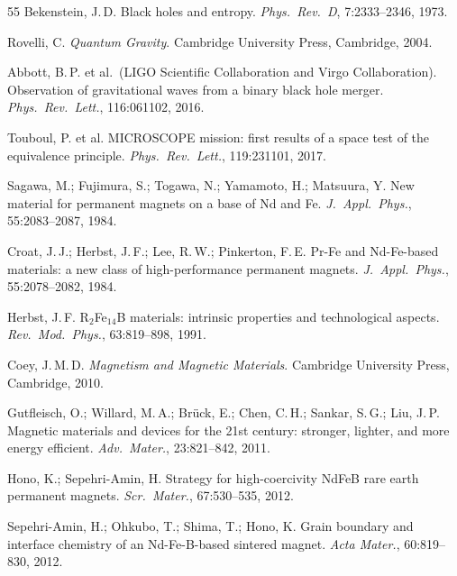﻿\documentclass[12pt, a4paper]{report}
\theoremstyle{definition}
\theoremstyle{remark}
\begin{document}
\begin{thebibliography}{55}
  Bekenstein, J.\,D.
  Black holes and entropy.
  \textit{Phys.\ Rev.\ D}, 7:2333--2346, 1973.

  Rovelli, C.
  \textit{Quantum Gravity}.
  Cambridge University Press, Cambridge, 2004.

  Abbott, B.\,P. et al.\ (LIGO Scientific Collaboration and Virgo Collaboration).
  Observation of gravitational waves from a binary black hole merger.
  \textit{Phys.\ Rev.\ Lett.}, 116:061102, 2016.

  Touboul, P. et al.
  MICROSCOPE mission: first results of a space test of the equivalence principle.
  \textit{Phys.\ Rev.\ Lett.}, 119:231101, 2017.


  Sagawa, M.; Fujimura, S.; Togawa, N.; Yamamoto, H.; Matsuura, Y.
  New material for permanent magnets on a base of Nd and Fe.
  \textit{J.\ Appl.\ Phys.}, 55:2083--2087, 1984.

  Croat, J.\,J.; Herbst, J.\,F.; Lee, R.\,W.; Pinkerton, F.\,E.
  Pr-Fe and Nd-Fe-based materials: a new class of high-performance permanent magnets.
  \textit{J.\ Appl.\ Phys.}, 55:2078--2082, 1984.

  Herbst, J.\,F.
  R$_2$Fe$_{14}$B materials: intrinsic properties and technological aspects.
  \textit{Rev.\ Mod.\ Phys.}, 63:819--898, 1991.

  Coey, J.\,M.\,D.
  \textit{Magnetism and Magnetic Materials}.
  Cambridge University Press, Cambridge, 2010.

  Gutfleisch, O.; Willard, M.\,A.; Br\"uck, E.; Chen, C.\,H.;
  Sankar, S.\,G.; Liu, J.\,P.
  Magnetic materials and devices for the 21st century: stronger, lighter,
  and more energy efficient.
  \textit{Adv.\ Mater.}, 23:821--842, 2011.

  Hono, K.; Sepehri-Amin, H.
  Strategy for high-coercivity NdFeB rare earth permanent magnets.
  \textit{Scr.\ Mater.}, 67:530--535, 2012.

  Sepehri-Amin, H.; Ohkubo, T.; Shima, T.; Hono, K.
  Grain boundary and interface chemistry of an Nd-Fe-B-based sintered magnet.
  \textit{Acta Mater.}, 60:819--830, 2012.


\end{thebibliography}
\end{document}

